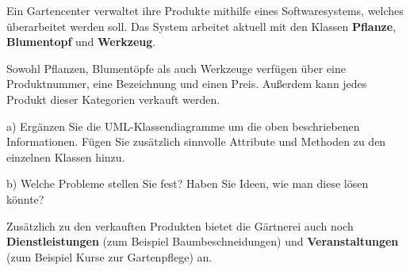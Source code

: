 \documentclass[11pt, a4paper, oneside]{article}
\begin{document}
	
	
	
	Ein Gartencenter verwaltet ihre Produkte mithilfe eines Softwaresystems, welches überarbeitet werden soll.
	Das System arbeitet aktuell mit den Klassen \textbf{Pflanze}, \textbf{Blumentopf} und \textbf{Werkzeug}.
	
	Sowohl Pflanzen, Blumentöpfe als auch Werkzeuge verfügen über eine Produktnummer, eine Bezeichnung und einen Preis.
	Außerdem kann jedes Produkt dieser Kategorien verkauft werden.
	
	a) Ergänzen Sie die UML-Klassendiagramme um die oben beschriebenen Informationen.
	Fügen Sie zusätzlich sinnvolle Attribute und Methoden zu den einzelnen Klassen hinzu.
	
	\begin{figure}[h]
		\centering
		\vspace{5cm}
	\end{figure}
	
	b) Welche Probleme stellen Sie fest? Haben Sie Ideen, wie man diese lösen könnte?
	
	\lines[3cm]
	
	
	Zusätzlich zu den verkauften Produkten bietet die Gärtnerei auch noch \textbf{Dienstleistungen} (zum Beispiel Baumbeschneidungen) und \textbf{Veranstaltungen} (zum Beispiel Kurse zur Gartenpflege) an.
	
\end{document}
